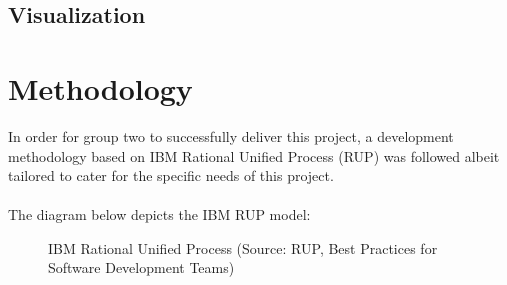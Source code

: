 \documentclass[12pt]{article} %
\begin{document}
	
	
	
	
	
	
	
	\subsection{Visualization}
	

	
	
	\section{Methodology}
	
	
	In order for group two to successfully deliver this project, a development methodology based on IBM Rational Unified Process (RUP) was followed albeit tailored to cater for the specific needs of this project.\\
	\\
	The diagram below depicts the IBM RUP model:
	
		\begin{figure}[H] %
			\caption{IBM Rational Unified Process (Source: RUP, Best Practices for Software Development Teams)}
			\label{fig:speciation}
		\end{figure}
		
\end{document}
